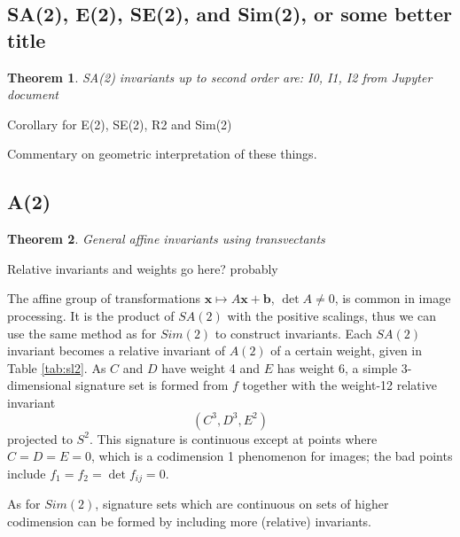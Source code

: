 \documentclass{article}
\newtheorem{theorem}{Theorem}
\begin{document}
\subsection{SA(2), E(2), SE(2), and Sim(2), or some better title}
\begin{theorem}
  SA(2) invariants up to second order are:
  I0, I1, I2 from Jupyter document
\end{theorem}

Corollary for E(2), SE(2), R2 and Sim(2)

Commentary on geometric interpretation of these things.
\subsection{A(2)}
\begin{theorem}
  General affine invariants using transvectants
\end{theorem}
Relative invariants and weights go here? probably

The affine group of transformations  $\mathbf{x}\mapsto A\mathbf{x}+\mathbf{b}$, $\det A\ne 0$,
is common in image processing. It is the product of $SA(2)$ with the positive scalings, thus
we can use the same method as for $Sim(2)$ to construct invariants. Each $SA(2)$ invariant
becomes a relative invariant of $A(2)$ of a certain weight, given in Table \ref{tab:sl2}.
 As $C$ and $D$ have weight 4 and
$E$ has weight 6, a simple 3-dimensional signature set is formed from $f$ together with
the weight-12 relative invariant
$$(C^3,D^3,E^2)$$
projected to $S^2$. This signature is continuous except at points where $C=D=E=0$, which 
is a codimension 1 phenomenon for images; the bad points include $f_1=f_2=\det f_{ij}=0$.

As for $Sim(2)$, signature sets which are continuous on sets of higher codimension can be
formed by including more (relative) invariants.
\end{document}
